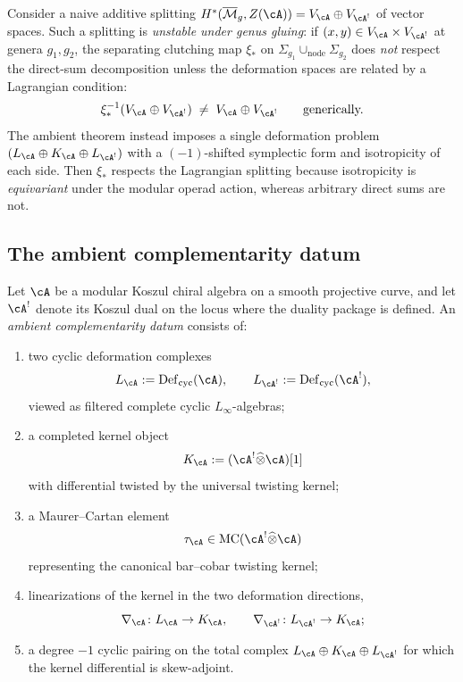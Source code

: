 \begin{remark}
\label{rem:why-additive-not-enough}
Consider a naive additive splitting
$H^*(\overline{\mathcal{M}}_g, Z(\cA))
= V_{\cA} \oplus V_{\cA^!}$
of vector spaces. Such a splitting is \emph{unstable under
genus gluing}: if $(x,y) \in V_{\cA} \times V_{\cA^!}$ at
genera $g_1, g_2$, the separating clutching map $\xi_*$ on
$\Sigma_{g_1} \cup_{\mathrm{node}} \Sigma_{g_2}$ does
\emph{not} respect the direct-sum decomposition unless the
deformation spaces are related by a Lagrangian condition:
\[
\xi_*^{-1}(V_{\cA} \oplus V_{\cA^!})
\;\neq\;
V_{\cA} \oplus V_{\cA^!}
\qquad\text{generically.}
\]
The ambient theorem instead imposes a single deformation
problem $(L_{\cA} \oplus K_{\cA} \oplus L_{\cA^!})$ with a
$(-1)$-shifted symplectic form and isotropicity of each side.
Then $\xi_*$ respects the Lagrangian splitting because
isotropicity is \emph{equivariant} under the modular operad
action, whereas arbitrary direct sums are not.
\end{remark}

\subsection{The ambient complementarity datum}
\label{subsec:ambient-complementarity-datum}

\begin{definition}
\label{def:ambient-complementarity-datum}
Let $\cA$ be a modular Koszul chiral algebra on a smooth projective
curve, and let $\cA^!$ denote its Koszul dual on the locus where the
duality package is defined. An \emph{ambient complementarity datum}
consists of:
\begin{enumerate}[label=\textup{(\roman*)}]
\item two cyclic deformation complexes
\[
L_{\cA} := \operatorname{Def}_{\mathrm{cyc}}(\cA),
\qquad
L_{\cA^!} := \operatorname{Def}_{\mathrm{cyc}}(\cA^!),
\]
viewed as filtered complete cyclic $L_\infty$-algebras;
\item a completed kernel object
\[
K_{\cA} := (\cA^! \widehat\otimes \cA)[1]
\]
with differential twisted by the universal twisting kernel;
\item a Maurer--Cartan element
\[
\tau_{\cA} \in \operatorname{MC}(\cA^! \widehat\otimes \cA)
\]
representing the canonical bar--cobar twisting kernel;
\item linearizations of the kernel in the two deformation directions,
\[
\nabla_{\cA} \colon L_{\cA} \to K_{\cA},
\qquad
\nabla_{\cA^!} \colon L_{\cA^!} \to K_{\cA};
\]
\item a degree $-1$ cyclic pairing on the total complex
$L_{\cA} \oplus K_{\cA} \oplus L_{\cA^!}$
for which the kernel differential is skew-adjoint.
\end{enumerate}
\end{definition}


